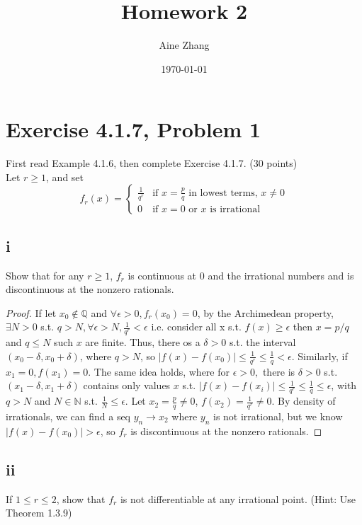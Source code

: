 \documentclass{article}
\title{Homework 2}
\author{Aine Zhang}
\date\today
\begin{document}
\maketitle %

\section*{Exercise 4.1.7, Problem 1}
First read Example 4.1.6, then complete Exercise 4.1.7. (30 points) \\
Let $r \geq 1$, and set
$$
f_r(x) = 
\begin{cases}
    \frac{1}{q^r} &  \text{if } x = \frac{p}{q} \text{ in lowest terms, } x \neq 0\\
    0 & \text{if } x = 0 \text{ or } x \text{ is irrational}
\end{cases}
$$

\subsection*{i} Show that for any $r \geq 1$, $f_r$ is continuous at 0 and the irrational numbers and is discontinuous at the nonzero rationals.

\begin{proof}
If let $x_0 \notin \mathbb{Q}$ and $\forall \epsilon > 0, f_r(x_0) = 0$, by the Archimedean property, $\exists N >0$ s.t. $q > N, \forall \epsilon >N, \frac{1}{q^r} < \epsilon$ i.e. consider all x s.t. $f(x) \geq \epsilon $ then $x=p/q$ and $q \leq N$ such $x$ are finite. Thus, there os a $\delta >0$ s.t. the interval $(x_0-\delta, x_0+\delta)$, where $q >N$, so $|f(x)-f(x_0)| \leq \frac{1}{q^r} \leq \frac{1}{q} < \epsilon$. Similarly, if $x_1 = 0, f(x_1)=0$. The same idea holds, where for $\epsilon >0,$ there is $\delta>0$ s.t. $(x_1 -\delta, x_1+\delta)$ contains only values $x$ s.t. $|f(x)-f(x_i)| \leq \frac{1}{q^r} \leq \frac{1}{q} \leq \epsilon$, with $q >N$ and $N \in \mathbb{N}$ s.t. $\frac{1}{N} \leq \epsilon.$ Let $x_2=\frac{p}{q} \neq 0$, $f(x_2)=\frac{1}{q^r} \neq 0.$ By density of irrationals, we can find a seq $y_n\rightarrow x_2$ where $y_n$ is not irrational, but we know $|f(x)-f(x_0)| > \epsilon$, so $f_r $ is discontinuous at the nonzero rationals.
\end{proof}

\subsection*{ii} If $1 \leq r \leq 2$, show that $f_r$ is not differentiable at any irrational point. (Hint: Use Theorem 1.3.9)
\end{document}
